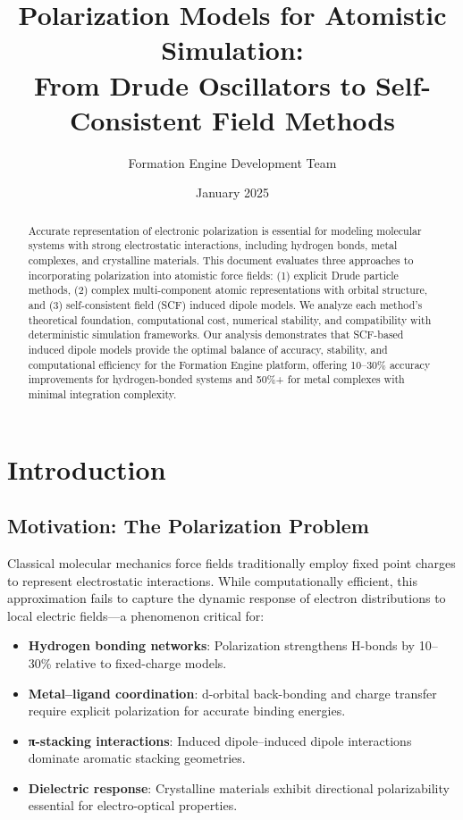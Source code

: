 \documentclass[11pt,letterpaper]{article}
\title{\textbf{Polarization Models for Atomistic Simulation:\\
From Drude Oscillators to Self-Consistent Field Methods}}
\author{Formation Engine Development Team}
\date{January 2025}
\begin{document}
\maketitle

\begin{abstract}
Accurate representation of electronic polarization is essential for modeling molecular systems with strong electrostatic interactions, including hydrogen bonds, metal complexes, and crystalline materials. This document evaluates three approaches to incorporating polarization into atomistic force fields: (1) explicit Drude particle methods, (2) complex multi-component atomic representations with orbital structure, and (3) self-consistent field (SCF) induced dipole models. We analyze each method's theoretical foundation, computational cost, numerical stability, and compatibility with deterministic simulation frameworks. Our analysis demonstrates that SCF-based induced dipole models provide the optimal balance of accuracy, stability, and computational efficiency for the Formation Engine platform, offering 10--30\% accuracy improvements for hydrogen-bonded systems and 50\%+ for metal complexes with minimal integration complexity.
\end{abstract}

\section{Introduction}

\subsection{Motivation: The Polarization Problem}

Classical molecular mechanics force fields traditionally employ fixed point charges to represent electrostatic interactions. While computationally efficient, this approximation fails to capture the dynamic response of electron distributions to local electric fields—a phenomenon critical for:

\begin{itemize}
    \item \textbf{Hydrogen bonding networks}: Polarization strengthens H-bonds by 10--30\% relative to fixed-charge models\cite{lamoureux2003}.
    \item \textbf{Metal--ligand coordination}: d-orbital back-bonding and charge transfer require explicit polarization for accurate binding energies\cite{comba2003}.
    \item \textbf{π-stacking interactions}: Induced dipole--induced dipole interactions dominate aromatic stacking geometries\cite{grimme2010}.
    \item \textbf{Dielectric response}: Crystalline materials exhibit directional polarizability essential for electro-optical properties.
\end{itemize}
\end{document}
